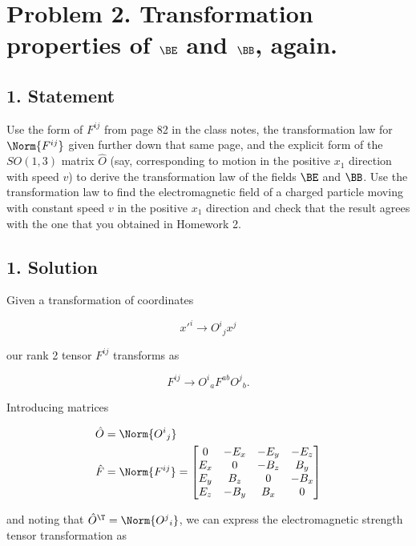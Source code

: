 \section{Problem 2.  Transformation properties of $\BE$ and $\BB$, again.}
\subsection{1. Statement}

Use the form of $F^{i j}$ from page 82 in the class notes, the transformation law for $\Norm{ F^{i j} }$ given further down that same page, and the explicit form of the $SO(1,3)$ matrix $\hat{O}$ (say, corresponding to motion in the positive $x_1$ direction with speed $v$) to derive the transformation law of the fields $\BE$ and $\BB$.  Use the transformation law to find the electromagnetic field of a charged particle moving with constant speed $v$ in the positive $x_1$ direction and check that the result agrees with the one that you obtained in Homework 2.

\subsection{1. Solution}

Given a transformation of coordinates 

\begin{equation}\label{eqn:relElectroDynProblemSet3:1220}
{x'}^i \rightarrow {O^i}_j x^j
\end{equation}

our rank 2 tensor $F^{i j}$ transforms as

\begin{equation}\label{eqn:relElectroDynProblemSet3:1240}
F^{i j} \rightarrow 
{O^i}_a
F^{a b}
{O^j}_b.
\end{equation}

Introducing matrices

\begin{align}\label{eqn:relElectroDynProblemSet3:1260}
\hat{O} &= \Norm{{O^i}_j} \\
\hat{F} &= 
\Norm{F^{ij}} = 
\begin{bmatrix}
0 & -E_x & -E_y & -E_z \\
E_x & 0 & -B_z & B_y \\
E_y & B_z & 0 & -B_x \\
E_z & -B_y & B_x & 0
\end{bmatrix} 
\end{align}

and noting that $\hat{O}^\T = \Norm{{O^j}_i}$, we can express the electromagnetic strength tensor transformation as

